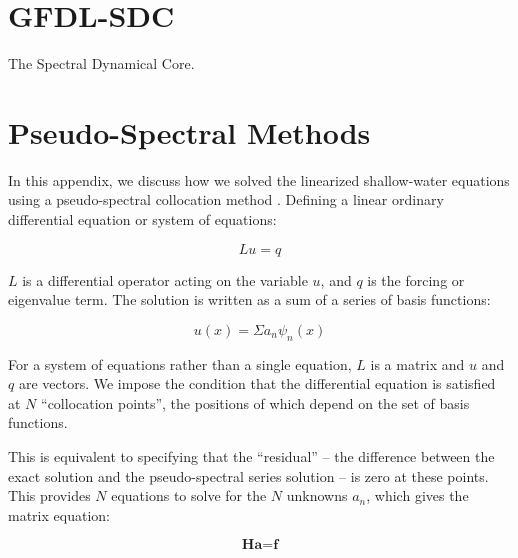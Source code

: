 








\chapter{GFDL-SDC}\label{ap:gfdl-sdc}

The Spectral Dynamical Core.


\chapter{Pseudo-Spectral Methods}\label{ap:ps-methods}


In this appendix, we discuss how we solved the linearized shallow-water equations using a pseudo-spectral collocation method \citep{boyd2000spectral}. Defining a linear ordinary differential equation or system of equations:

\begin{equation}
  L u = q
\end{equation}

$L$ is a differential operator acting on the variable $u$, and $q$ is the forcing or eigenvalue term. The solution is written as a sum of a series of basis functions:

\begin{equation}\label{eqn:pseudospectral_sum}
  u(x) = \Sigma a_{n} \psi_{n}(x)
\end{equation}

For a system of equations rather than a single equation, $L$ is a matrix and $u$ and $q$ are vectors. We impose the condition that the differential equation is satisfied at $N$ ``collocation points'', the positions of which depend on the set of basis functions.

This is equivalent to specifying that the ``residual'' -- the difference between the exact solution and the pseudo-spectral series solution -- is zero at these points. This provides $N$ equations to solve for the $N$ unknowns $a_{n}$, which gives the matrix equation:

\begin{equation}\label{eqn:ps_matrix}
  \textbf{H} \textbf{a} = \textbf{f}
\end{equation}

